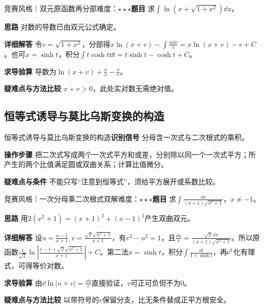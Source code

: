 \begin{example}{竞赛风格｜双元原函数再分部}{难度：$\star\star\star$}\label{ic:ex:indefinite_dual_complete:dual_log}\textbf{题目} 求$\int\ln(x+\sqrt{1+x^2})\dd x$。\par \textbf{思路} 对数的导数已由双元公式确定。\par \textbf{详细解答} 令$v=\sqrt{1+x^2}$，分部得$x\ln(x+v)-\int \frac{x\dd x}{v}=x\ln(x+v)-v+C$。也可$x=\sinh t$，积分$\int t\cosh t\dd t=t\sinh t-\cosh t+C$。\par \textbf{求导验算} 导数为$\ln(x+v)+\frac{x}{v}-\frac{x}{v}$。\par \textbf{疑难点与方法比较} $x+v>0$，此处实对数无需绝对值。\end{example}

\subsection{恒等式诱导与莫比乌斯变换的构造}\label{ic:indefinite_dual_complete:mobius}\begin{method}{恒等式诱导与莫比乌斯变换的构造}\textbf{识别信号} 分母含一次式与二次根式的乘积。\par \textbf{操作步骤} 把二次式写成两个一次式平方和或差，分别除以同一个一次式平方；所产生的两个比值满足圆或双曲关系；计算比值微分。\par \textbf{疑难点与条件} 不能只写“注意到恒等式”，须给平方展开或系数比较。\end{method}

\begin{example}{竞赛风格｜一次分母乘二次根式双解}{难度：$\star\star\star$}\label{ic:ex:indefinite_dual_complete:mobiusroot}\textbf{题目} 求$\int\frac{\dd x}{(x+1)\sqrt{x^2+1}}$，$x\ne-1$。\par \textbf{思路} 用$2(x^2+1)=(x+1)^2+(x-1)^2$产生双曲双元。\par \textbf{详细解答} 设$u=\frac{x-1}{x+1},v=\frac{\sqrt2\sqrt{x^2+1}}{x+1}$，有$v^2-u^2=1$，且$\frac{\dd u}{v}=\frac{\sqrt2\,\dd x}{(x+1)\sqrt{x^2+1}}$。所以原函数$\frac1{\sqrt2}\ln\left|\frac{x-1+\sqrt2\sqrt{x^2+1}}{x+1}\right|+C$。第二法$x=\sinh t$，积分$\int\frac{\dd t}{1+\sinh t}$，再$\mathrm{e}^t$化有理式，可得等价对数。\par \textbf{求导验算} 由$\dd\ln|u+v|=\frac{\dd u}{v}$直接验证，$v$可正可负但不为0。\par \textbf{疑难点与方法比较} 以带符号的$v$保留分支，比无条件替成正平方根安全。\end{example}

